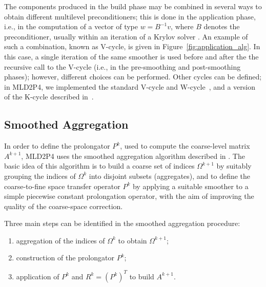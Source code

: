 The components produced in the build phase may be combined in several ways
to obtain different multilevel preconditioners;
this is  done in the application phase, i.e., in the computation of a vector
of type $w=B^{-1}v$, where $B$ denotes the preconditioner, usually within an iteration
of a Krylov solver \cite{Saad_book}. An example of such a combination, known as
V-cycle, is given in Figure~\ref{fig:application_alg}. In this case, a single iteration
of the same smoother is used before and after the the recursive call to the V-cycle (i.e.,
in the pre-smoothing and post-smoothing phases); however, different choices can be
performed. Other cycles can be defined; in MLD2P4, we implemented the standard V-cycle
and W-cycle~\cite{Briggs2000}, and a version of the K-cycle described in~\cite{Notay2008}. 


\subsection{Smoothed Aggregation\label{sec:aggregation}}

In order to define the prolongator $P^k$, used to compute
the coarse-level matrix $A^{k+1}$, MLD2P4 uses the smoothed aggregation
algorithm described in \cite{BREZINA_VANEK,VANEK_MANDEL_BREZINA}.
The basic idea of this algorithm is to build a coarse set of indices
$\Omega^{k+1}$ by suitably grouping the indices of $\Omega^k$ into disjoint
subsets (aggregates), and to define the coarse-to-fine space transfer operator
$P^k$ by applying a suitable smoother to a simple piecewise constant
prolongation operator, with the aim of improving the quality of the coarse-space correction.

Three main steps can be identified in the smoothed aggregation procedure:
\begin{enumerate}
        \item aggregation of the indices of $\Omega^k$ to obtain $\Omega^{k+1}$;
        \item construction of the prolongator $P^k$;
        \item application of $P^k$ and $R^k=(P^k)^T$ to build $A^{k+1}$.
\end{enumerate}
 
